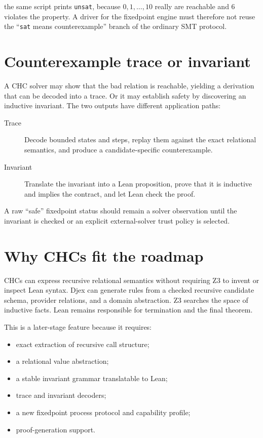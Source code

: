 \documentclass[10pt,letterpaper,oneside]{report}
\newcommand{\sat}{\texttt{sat}}
\newcommand{\unsat}{\texttt{unsat}}
\begin{document}
the same script prints \unsat, because $0,1,\dots,10$ really are reachable and $6$ violates the property. A driver for the fixedpoint engine must therefore not reuse the ``\sat{} means counterexample'' branch of the ordinary SMT protocol.

\section{Counterexample trace or invariant}

A CHC solver may show that the bad relation is reachable, yielding a derivation that can be decoded into a trace. Or it may establish safety by discovering an inductive invariant. The two outputs have different application paths:

\begin{description}
\item[Trace] Decode bounded states and steps, replay them against the exact relational semantics, and produce a candidate-specific counterexample.
\item[Invariant] Translate the invariant into a Lean proposition, prove that it is inductive and implies the contract, and let Lean check the proof.
\end{description}

A raw ``safe'' fixedpoint status should remain a solver observation until the invariant is checked or an explicit external-solver trust policy is selected.

\section{Why CHCs fit the roadmap}

CHCs can express recursive relational semantics without requiring Z3 to invent or inspect Lean syntax. Djex can generate rules from a checked recursive candidate schema, provider relations, and a domain abstraction. Z3 searches the space of inductive facts. Lean remains responsible for termination and the final theorem.

This is a later-stage feature because it requires:

\begin{itemize}
\item exact extraction of recursive call structure;
\item a relational value abstraction;
\item a stable invariant grammar translatable to Lean;
\item trace and invariant decoders;
\item a new fixedpoint process protocol and capability profile;
\item proof-generation support.
\end{itemize}
\end{document}
